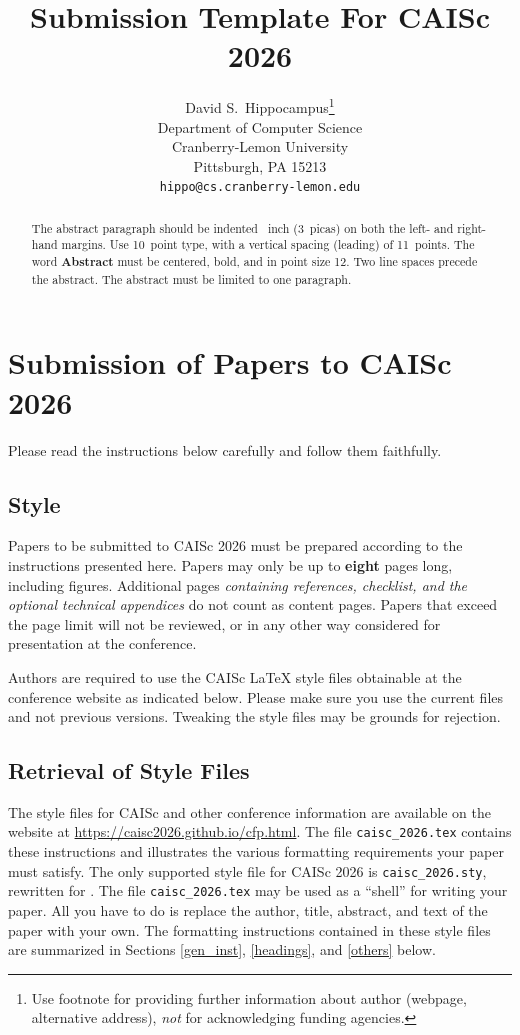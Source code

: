 \documentclass{article}
\title{Submission Template For CAISc 2026}
\author{%
  David S.~Hippocampus\thanks{Use footnote for providing further information
    about author (webpage, alternative address), \emph{not} for acknowledging
    funding agencies.} \\
  Department of Computer Science\\
  Cranberry-Lemon University\\
  Pittsburgh, PA 15213 \\
  \texttt{hippo@cs.cranberry-lemon.edu} \\
}
\begin{document}
\maketitle

\begin{abstract}
  The abstract paragraph should be indented ~inch (3~picas) on both the left- and right-hand margins. Use 10~point type, with a vertical spacing (leading) of 11~points.  The word \textbf{Abstract} must be centered, bold, and in point size 12. Two line spaces precede the abstract. The abstract must be limited to one paragraph.
\end{abstract}

\section{Submission of Papers to CAISc 2026}

Please read the instructions below carefully and follow them faithfully.

\subsection{Style}

Papers to be submitted to CAISc 2026 must be prepared according to the instructions presented here. Papers may only be up to {\bf eight} pages long, including figures. Additional pages \emph{containing references, checklist, and the optional technical appendices} do not count as content pages. Papers that exceed the page limit will not be reviewed, or in any other way considered for presentation at the conference.

Authors are required to use the CAISc \LaTeX{} style files obtainable at the conference website as indicated below. Please make sure you use the current files and not previous versions. Tweaking the style files may be grounds for rejection.

\subsection{Retrieval of Style Files}

The style files for CAISc and other conference information are available on the website at \url{https://caisc2026.github.io/cfp.html}. The file \verb+caisc_2026.tex+ contains these instructions and illustrates the various formatting requirements your paper must satisfy. The only supported style file for CAISc 2026 is \verb+caisc_2026.sty+, rewritten for \LaTeXe{}. The file \verb+caisc_2026.tex+ may be used as a ``shell'' for writing your paper. All you have to do is replace the author, title, abstract, and text of the paper with your own. The formatting instructions contained in these style files are summarized in Sections \ref{gen_inst}, \ref{headings}, and \ref{others} below.
\end{document}
